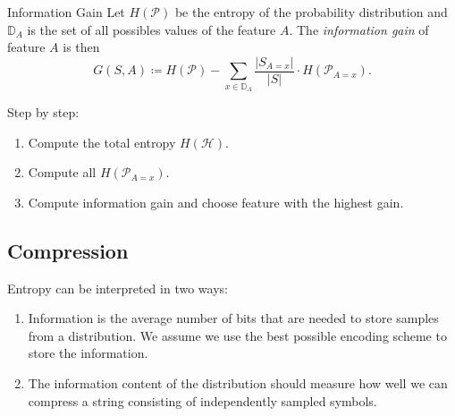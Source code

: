 \documentclass[english]{panikzettel}
\begin{document}
\begin{halfboxl}
\vspace{-\baselineskip}
	\begin{defi}{Information Gain}
	Let $H(\mathcal{P})$ be the entropy of the probability distribution and $\mathbb{D}_A$ is the set of all possibles values of the feature $A$. The \emph{information gain} of feature $A$ is then
	\[
	G(S,A)\coloneqq H(\mathcal{P}) -\sum_{x\in\mathbb{D}_A}\frac{|S_{A=x}|}{|S|}\cdot H(\mathcal{P}_{A=x}).
	\]
	\end{defi}
\end{halfboxl}
\begin{halfboxr}
\vspace{-\baselineskip}
	Step by step:
\begin{enumerate}
    \item Compute the total entropy $H(\mathcal{H})$.
    \item Compute all $H(\mathcal{P}_{A=x})$.
    \item Compute information gain and choose feature with the highest gain.
\end{enumerate}

\end{halfboxr}



\subsection{Compression}
Entropy can be interpreted in two ways:
\begin{enumerate}
\item Information is the average number of bits that are needed to store samples from a distribution. We assume we use the best possible encoding scheme to store the information.
\item The information content of the distribution should measure how well we can compress a string consisting of independently sampled symbols.
\end{enumerate}

\end{document}
